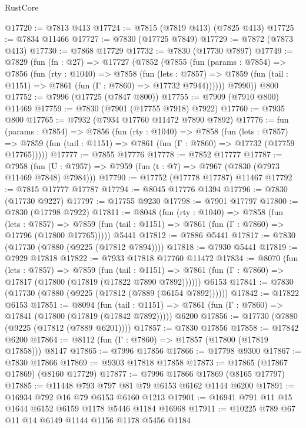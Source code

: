 \begin{lexlean}{RustCore}
\begin{coremodule}
@17720 := @7813 @413
@17724 := @7815 (@7819 @413) (@7825 @413)
@17725 := @7834 @11466
@17727 := @7830 (@17725 @7849)
@17729 := @7872 (@7873 @413)
@17730 := @7868 @17729
@17732 := @7830 (@17730 @7897)
@17749 := @7829
    (fun (fn : @27) =>
    @17727
      (@7852
        (@7855
          (fun (params : @7854) =>
          @7856
            (fun (rty : @1040) =>
            @7858
              (fun (lets : @7857) =>
              @7859 (fun (tail : @1151) => @7861 (fun (Γ : @7860) => @17732 @7944))))))
        @7990))
    @800
@17752 := @7996 (@17725 (@7847 @800))
@17755 := @7909 (@7910 @800) @11469
@17759 := @7830 (@7901 (@17755 @7918) @7922)
@17760 := @7935 @800
@17765 := @7932 (@7934 @17760 @11472 @7890 @7892)
@17776 := fun (params : @7854) =>
  @7856
    (fun (rty : @1040) =>
    @7858
      (fun (lets : @7857) =>
      @7859 (fun (tail : @1151) => @7861 (fun (Γ : @7860) => @17732 (@17759 @17765)))))
@17777 := @7855 @17776
@17778 := @7852 @17777
@17787 := @7958
    (fun (U : @7957) => @7959 (fun (t : @7) => @7967 (@7830 (@7973 @11469 @7848) @7984)))
@17790 := @17752 (@17778 @17787) @11467
@17792 := @7815 @17777 @17787
@17794 := @8045 @17776 @1394
@17796 := @7830 (@17730 @9227)
@17797 := @17755 @9230
@17798 := @7901 @17797
@17800 := @7830 (@17798 @7922)
@17811 := @8048
    (fun (rty : @1040) =>
    @7858
      (fun (lets : @7857) =>
      @7859 (fun (tail : @1151) => @7861 (fun (Γ : @7860) => @17796 (@17800 @17765)))))
    @5441
@17812 := @7886 @5441
@17817 := @7830 (@17730 (@7880 (@9225 (@17812 @7894))))
@17818 := @7930 @5441
@17819 := @7929 @17818
@17822 := @7933 @17818 @17760 @11472
@17834 := @8070
    (fun (lets : @7857) =>
    @7859
      (fun (tail : @1151) =>
      @7861 (fun (Γ : @7860) => @17817 (@17800 (@17819 (@17822 @7890 @7892))))))
    @6153
@17841 := @7830 (@17730 (@7880 (@9225 (@17812 (@7889 (@6154 @7892))))))
@17842 := @17822 @6153
@17851 := @8094
    (fun (tail : @1151) => @7861 (fun (Γ : @7860) => @17841 (@17800 (@17819 (@17842 @7892)))))
    @6200
@17856 := @17730 (@7880 (@9225 (@17812 (@7889 @6201))))
@17857 := @7830 @17856
@17858 := @17842 @6200
@17864 := @8112 (fun (Γ : @7860) => @17857 (@17800 (@17819 @17858))) @8147
@17865 := @7996 @17856
@17866 := @17798 @9300
@17867 := @7830 @17866
@17869 := @9303 @17818 @17858
@17873 := @17865 (@17867 @17869) (@8160 @17729)
@17877 := @7996 @17866 @17869 (@8165 @17797)
@17885 := @11448 @793 @797 @81 @79 @6153 @6162 @1144 @6200
@17891 := @16934 @792 @16 @79 @6153 @6160 @1213
@17901 := @16941 @791 @11 @15 @1644 @6152 @6159 @1178 @5446 @1184 @16968
@17911 := @10225 @789 @67 @11 @14 @6149 @1144 @1156 @1178 @5456 @1184

\end{coremodule}
\end{lexlean}
